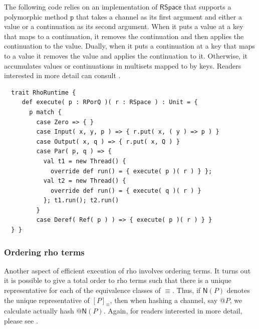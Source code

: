 The following code relies on an implementation of $\mathsf{RSpace}$
that supports a polymorphic method $\texttt{p}$ that takes a channel
as its first argument and either a value or a continuation as its
second argument. When it puts a value at a key that maps to a
continuation, it removes the continuation and then applies the
continuation to the value. Dually, when it puts a continuation at a
key that maps to a value it removes the value and applies the
continuation to it. Otherwise, it accumulates values or continuations
in multisets mapped to by keys. Readers interested in more detail can
consult \cite{f1r3fly-io:githubrepo}. \\

\begin{lstlisting}
  trait RhoRuntime {
     def execute( p : RPorQ )( r : RSpace ) : Unit = {
       p match {
         case Zero => { }
         case Input( x, y, p ) => { r.put( x, ( y ) => p ) }
         case Output( x, q ) => { r.put( x, Q ) }
         case Par( p, q ) => {
           val t1 = new Thread() {
             override def run() = { execute( p )( r ) } };
           val t2 = new Thread() {
             override def run() = { execute( q )( r ) }
           }; t1.run(); t2.run()
         }
         case Deref( Ref( p ) ) => { execute( p )( r ) } }
  } }
\end{lstlisting}

\subsubsection{Ordering rho terms}

Another aspect of efficient execution of rho involves ordering
terms. It turns out it is possible to give a total order to rho terms
such that there is a unique representative for each of the equivalence
classes of $\equiv$. Thus, if $\mathsf{N}(P)$ denotes the unique
representative of $[P]_{\equiv}$, then when hashing a channel, say
$\mathsf{@}P$, we calculate actually hash
$\mathsf{@}\mathsf{N}(P)$. Again, for readers interested in more
detail, please see \cite{f1r3fly-io:githubrepo}.

